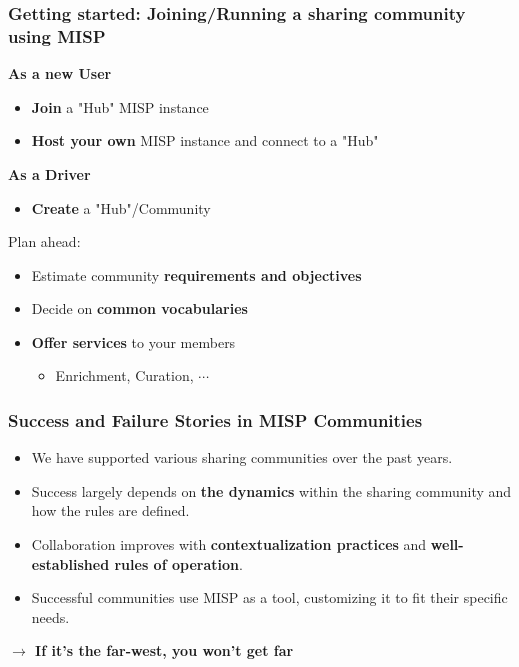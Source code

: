 \begin{frame}
    \frametitle{Getting started: Joining/Running a sharing community using MISP}

    \begin{minipage}[t]{0.5\textwidth}
        \begin{center}
            \bf \Large As a new User
        \end{center}
        \begin{itemize}
            \item \textbf{Join} a "Hub" MISP instance
            \item \textbf{Host your own} MISP instance and connect to a "Hub"
        \end{itemize}
    \end{minipage}%
    \begin{minipage}[t]{0.5\textwidth}
        \begin{center}
            \bf \Large As a Driver
        \end{center}
        \begin{itemize}
            \item \textbf{Create} a "Hub"/Community
        \end{itemize}
        Plan ahead:
        \begin{itemize}
            \item Estimate community \textbf{requirements and objectives}
            \item Decide on \textbf{common vocabularies}
            \item \textbf{Offer services} to your members
            \begin{itemize}
                \item Enrichment, Curation, $\cdots$
            \end{itemize}
        \end{itemize}
    \end{minipage}%
\end{frame}

\begin{frame}
    \frametitle{Success and Failure Stories in MISP Communities}
    \begin{itemize}
        \item We have supported various sharing communities over the past years.
	\item Success largely depends on {\bf the dynamics} within the sharing community and how the rules are defined.
	\item Collaboration improves with {\bf contextualization practices} and {\bf well-established rules of operation}.
        \item Successful communities use MISP as a tool, customizing it to fit their specific needs.
    \end{itemize}

    \begin{center}
        \textbf{$\rightarrow$ If it's the far-west, you won't get far}
    \end{center}
\end{frame}

